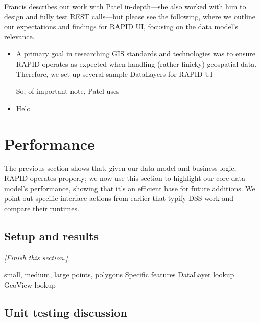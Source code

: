 Francis describes our work with Patel in-depth---she also worked with him to design and fully test REST calls---but please see the following, where we outline our expectations and findings for RAPID UI, focusing on the data model's relevance.

\begin{itemize}
\item A primary goal in researching GIS standards and technologies was to ensure RAPID operates as expected when handling (rather finicky) geospatial data. Therefore, we set up several sample DataLayers for RAPID UI

So, of important note, Patel uses

\item Helo
\end{itemize}

\section{Performance}
The previous section shows that, given our data model and business logic, RAPID operates properly; we now use this section to highlight our core data model's performance, showing that it's an efficient base for future additions. We point out specific interface actions from earlier that typify DSS work and compare their runtimes.

\subsection{Setup and results}
\textit{[Finish this section.]}

small, medium, large
points, polygons
Specific features
DataLayer lookup
GeoView lookup




\subsection{Unit testing discussion}


